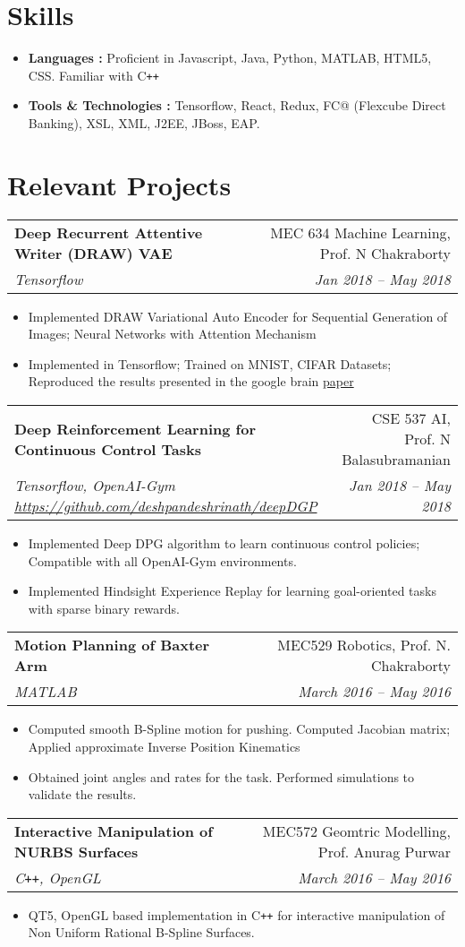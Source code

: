 \documentclass[letterpaper,10pt]{article}
\makeatletter
\newcommand{\resumeHeading}[4]{
  \vspace{-1pt}
    \begin{tabular*}{0.97\textwidth}{l@{\extracolsep{\fill}}r}
      \textbf{#1} & #2 \vspace{-2pt}\\ \vspace{1pt}
      \textit{\small#3} & \textit{\small #4} \\
    \end{tabular*}
}
\newcommand{\resumeSection}[1]{
\vspace{-12pt}
\section{\textbf{#1}}
}
\newcommand{\resumeItemListStart}{
\vspace{-7pt}
\begin{itemize}[leftmargin=14pt]
}
\newcommand{\resumeItemListEnd}{
\vspace{+7pt}
\end{itemize}
}
\newcommand{\resumeItem}[1]{
  \item\small{
      {#1 \vspace{-7pt}
      }
  }
}
\makeatother
\begin{document}
\resumeSection{Skills}
\vspace{+7pt}
    \resumeItemListStart
      \resumeItem{\textbf{Languages :} Proficient in Javascript, Java, Python, MATLAB, HTML5, CSS. Familiar with C\texttt{++}}
      \resumeItem{\textbf{Tools \& Technologies :} Tensorflow, React, Redux, FC@ (Flexcube Direct Banking), XSL, XML, J2EE, JBoss, EAP.}
    \resumeItemListEnd


    \resumeSection{Relevant Projects}

    \resumeHeading{Deep Recurrent Attentive Writer (DRAW) VAE }{MEC 634 Machine Learning, Prof. N Chakraborty}{Tensorflow}{Jan 2018 -- May 2018}
    \resumeItemListStart
      \resumeItem{Implemented DRAW Variational Auto Encoder for Sequential Generation of Images; Neural Networks with Attention Mechanism}
      \resumeItem{Implemented in Tensorflow; Trained on MNIST, CIFAR Datasets; Reproduced the results presented in the google brain \href{https://arxiv.org/abs/1502.04623}{paper}}
    \resumeItemListEnd

    \resumeHeading{Deep Reinforcement Learning for Continuous Control Tasks}{CSE 537 AI, Prof. N Balasubramanian}{Tensorflow, OpenAI-Gym \href{https://github.com/deshpandeshrinath/deepDGP}{https://github.com/deshpandeshrinath/deepDGP}}{Jan 2018 -- May 2018}
    \resumeItemListStart
      \resumeItem{Implemented Deep DPG algorithm to learn continuous control policies; Compatible with all OpenAI-Gym environments.}
      \resumeItem{Implemented Hindsight Experience Replay for learning goal-oriented tasks with sparse binary rewards.}
    \resumeItemListEnd

    \resumeHeading{Motion Planning of Baxter Arm}{MEC529 Robotics, Prof. N. Chakraborty}{MATLAB}{March 2016 -- May 2016}
    \resumeItemListStart
      \resumeItem{Computed smooth B-Spline motion for pushing. Computed Jacobian matrix; Applied approximate Inverse Position Kinematics}
      \resumeItem{Obtained joint angles and rates for the task. Performed simulations to validate the results.}
    \resumeItemListEnd

    \resumeHeading{Interactive Manipulation of NURBS Surfaces}{MEC572 Geomtric Modelling, Prof. Anurag Purwar}{C\texttt{++}, OpenGL}{March 2016 -- May 2016}
    \resumeItemListStart
      \resumeItem{QT5, OpenGL based implementation in C\texttt{++} for interactive manipulation of Non Uniform Rational B-Spline Surfaces.}
    \resumeItemListEnd
\end{document}
